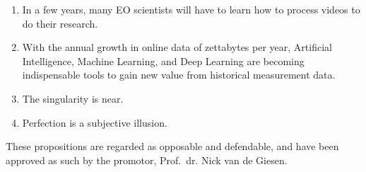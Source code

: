 \documentclass[oneside,10pt]{article}
\begin{document}
{\begin{enumerate}
\item In a few years, many EO scientists will have to learn how to process videos to do their research. \\

\item With the annual growth in online data of zettabytes per year, Artificial Intelligence, Machine Learning, and Deep Learning are becoming indispensable tools to gain new value from historical measurement data.

\item The singularity is near.



\item Perfection is a subjective illusion.

\end{enumerate}
}

\vspace{0.5cm}
\noindent These propositions are regarded as opposable and defendable, and have been approved as such by the promotor, Prof.~dr. Nick van de Giesen.
\end{document}
